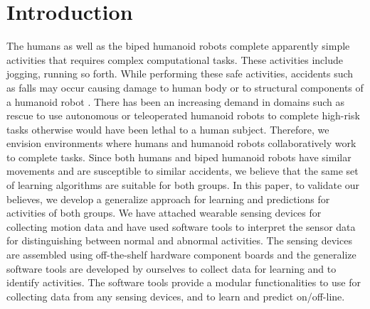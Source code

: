 \documentclass[letterpaper]{article}
\begin{document}
\section{Introduction}

The humans as well as the biped humanoid robots complete apparently simple activities that requires 
complex computational tasks. These activities include jogging, running so forth. While performing 
these safe activities, accidents such as falls may occur causing damage to human body or to 
structural components of a humanoid robot \cite{li2009accurate}. There has been an 
increasing demand in domains such as rescue to use autonomous or teleoperated humanoid robots to 
complete high-risk tasks otherwise would have been lethal to a human subject. Therefore, we 
envision environments where humans and humanoid robots collaboratively work to complete 
tasks. Since both humans and biped humanoid robots have similar movements and are susceptible to 
similar accidents, we believe that the same set of learning algorithms are suitable for both 
groups. In this paper,  to validate our believes, we develop a generalize approach for learning 
and predictions for activities of both groups.  We have attached wearable sensing devices for 
collecting motion data and have used software tools to interpret the sensor data for distinguishing 
between normal and abnormal activities. The sensing devices are assembled using off-the-shelf 
hardware component boards and the generalize software tools are developed by ourselves to 
collect data for learning and to identify activities. The software tools provide a modular 
functionalities to use for collecting  data from any sensing devices, and to learn and predict 
on/off-line.   
\end{document}
